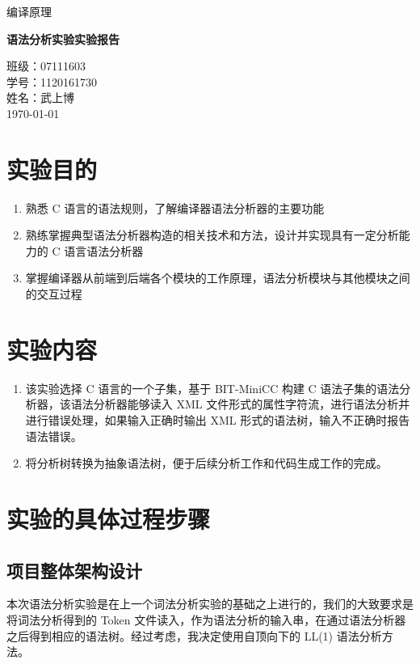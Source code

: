 \documentclass[UTF8]{ctexart}
\begin{document}
\begin{titlepage}
  \begin{center}
    \vspace*{1cm}

    \Large
    编译原理

    \vspace{0.5cm}
    \Huge
    \textbf{语法分析实验实验报告}

    \vfill

    \normalsize\kaishu
    班级：07111603 \\
    学号：1120161730 \\
    姓名：武上博 \\
    \today
    \vspace{1cm}
  \end{center}
\end{titlepage}

\tableofcontents
\newpage

\section{实验目的}
\begin{enumerate}
  \item 熟悉 C 语言的语法规则，了解编译器语法分析器的主要功能
  \item 熟练掌握典型语法分析器构造的相关技术和方法，设计并实现具有一定分析能力的 C 语言语法分析器
  \item 掌握编译器从前端到后端各个模块的工作原理，语法分析模块与其他模块之间的交互过程
\end{enumerate}

\section{实验内容}
\begin{enumerate}
  \item 该实验选择 C 语言的一个子集，基于 BIT-MiniCC 构建 C 语法子集的语法分析器，该语法分析器能够读入 XML 文件形式的属性字符流，进行语法分析并进行错误处理，如果输入正确时输出 XML 形式的语法树，输入不正确时报告语法错误。
  \item 将分析树转换为抽象语法树，便于后续分析工作和代码生成工作的完成。
\end{enumerate}

\section{实验的具体过程步骤}
\subsection{项目整体架构设计}
本次语法分析实验是在上一个词法分析实验的基础之上进行的，我们的大致要求是将词法分析得到的 Token 文件读入，作为语法分析的输入串，在通过语法分析器之后得到相应的语法树。经过考虑，我决定使用自顶向下的 LL(1) 语法分析方法。
\end{document}
